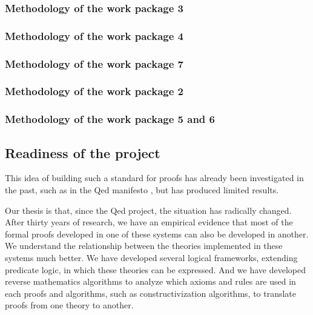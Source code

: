 \subsubsection{Methodology of the work package 3}

\subsubsection{Methodology of the work package 4}

\subsubsection{Methodology of the work package 7}

\subsubsection{Methodology of the work package 2}

\subsubsection{Methodology of the work package 5 and 6}


\subsection{Readiness of the project}

This idea of building such a standard for proofs has already been
investigated in the past, such as in the Qed manifesto \cite{Qed94}, but
has produced limited results.

Our thesis is that, since the
Qed project, the situation has radically changed. After
thirty years of research, we have an empirical evidence that most of
the formal proofs developed in one of these systems can also be
developed in another. We understand the relationship between the
theories implemented in these systems much better. We have developed
several logical frameworks, extending predicate logic, in which these
theories can be expressed. And we have developed reverse mathematics
algorithms to analyze which axioms and rules are used in each proofs
and algorithms, such as constructivization algorithms, to translate
proofs from one theory to another.


